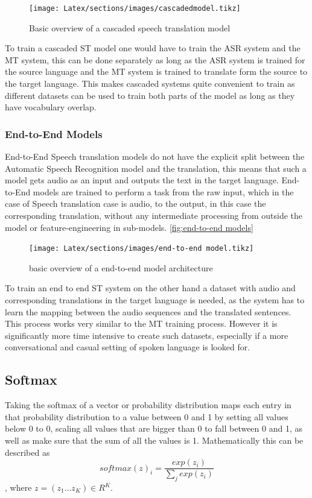\begin{figure}[ht]
    \centering%
    \texttt{[image: Latex/sections/images/cascadedmodel.tikz]}
\caption{Basic overview of a cascaded speech translation model}
\label{fig:cascadedmodel}
\end{figure}
To train a cascaded ST model one would have to train the ASR system and the MT system, this can be done separately as long as the ASR system is trained for the source language and the MT system is trained to translate form the source to the target language. This makes cascaded systems quite convenient to train as different datasets can be used to train both parts of the model as long as they have vocabulary overlap. 

\subsubsection{End-to-End Models}
End-to-End Speech translation models do not have the explicit split between the Automatic Speech Recognition model and the translation, this means that such a model gets audio as an input and outputs the text in the target language. 
End-to-End models are trained to perform a task from the raw input, which in the case of Speech translation case is audio, to the output, in this case the corresponding translation, without any intermediate processing from outside the model or feature-engineering in sub-models. \autoref{fig:end-to-end models}

\begin{figure}[ht]
    \centering%
    \texttt{[image: Latex/sections/images/end-to-end model.tikz]}

\caption{basic overview of a end-to-end model architecture}
\label{fig:end-to-end models}
\end{figure}

To train an end to end ST system on the other hand a dataset with audio and corresponding translations in the target language is needed, as the system has to learn the mapping between the audio sequences and the translated sentences. This process works very similar to the MT training process. However it is significantly more time intensive to create such datasets, especially if a more conversational and casual setting of spoken language is looked for. 


\subsection{Softmax}
Taking the softmax of a vector or probability distribution maps each entry in that probability distribution to a value between 0 and 1 by setting all values below 0 to 0, scaling all values that are bigger than 0 to fall between 0 and 1, as well as make sure that the sum of all the values is 1. 
Mathematically this can be described as $$softmax(z)_i=\frac{exp(z_i)}{\sum_j exp(z_i)}$$, where $z=(z_1\dots z_K)\in R^K$.


